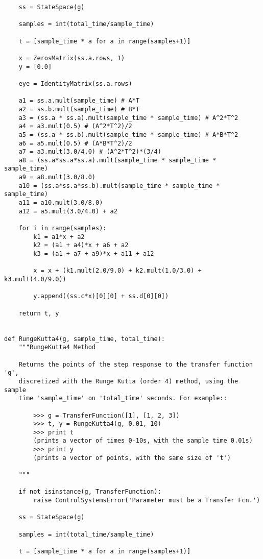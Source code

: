\begin{verbatim}
    ss = StateSpace(g)
    
    samples = int(total_time/sample_time)
    
    t = [sample_time * a for a in range(samples+1)]
    
    x = ZerosMatrix(ss.a.rows, 1)
    y = [0.0]
    
    eye = IdentityMatrix(ss.a.rows)
    
    a1 = ss.a.mult(sample_time) # A*T
    a2 = ss.b.mult(sample_time) # B*T
    a3 = (ss.a * ss.a).mult(sample_time * sample_time) # A^2*T^2
    a4 = a3.mult(0.5) # (A^2*T^2)/2
    a5 = (ss.a * ss.b).mult(sample_time * sample_time) # A*B*T^2
    a6 = a5.mult(0.5) # (A*B*T^2)/2
    a7 = a3.mult(3.0/4.0) # (A^2*T^2)*(3/4)
    a8 = (ss.a*ss.a*ss.a).mult(sample_time * sample_time * sample_time)
    a9 = a8.mult(3.0/8.0)
    a10 = (ss.a*ss.a*ss.b).mult(sample_time * sample_time * sample_time)
    a11 = a10.mult(3.0/8.0)
    a12 = a5.mult(3.0/4.0) + a2
    
    for i in range(samples):
        k1 = a1*x + a2
        k2 = (a1 + a4)*x + a6 + a2
        k3 = (a1 + a7 + a9)*x + a11 + a12
        
        x = x + (k1.mult(2.0/9.0) + k2.mult(1.0/3.0) + k3.mult(4.0/9.0))
        
        y.append((ss.c*x)[0][0] + ss.d[0][0])

    return t, y


def RungeKutta4(g, sample_time, total_time):
    """RungeKutta4 Method
    
    Returns the points of the step response to the transfer function 'g',
    discretized with the Runge Kutta (order 4) method, using the sample
    time 'sample_time' on 'total_time' seconds. For example::
    
        >>> g = TransferFunction([1], [1, 2, 3])
        >>> t, y = RungeKutta4(g, 0.01, 10)
        >>> print t
        (prints a vector of times 0-10s, with the sample time 0.01s)
        >>> print y
        (prints a vector of points, with the same size of 't')
    
    """
    
    if not isinstance(g, TransferFunction):
        raise ControlSystemsError('Parameter must be a Transfer Fcn.')

    ss = StateSpace(g)
    
    samples = int(total_time/sample_time)
    
    t = [sample_time * a for a in range(samples+1)]
    

\end{verbatim}

